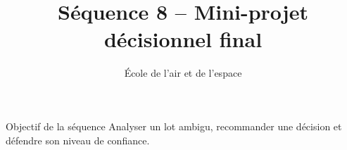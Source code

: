 \documentclass[aspectratio=169]{beamer}
\title{Séquence 8 -- Mini-projet décisionnel final}
\author{École de l'air et de l'espace}
\date{}
\begin{document}
\begin{frame}\titlepage\end{frame}
\begin{frame}{Objectif de la séquence}
  Analyser un lot ambigu, recommander une décision et défendre son niveau de confiance.
\end{frame}
\end{document}
